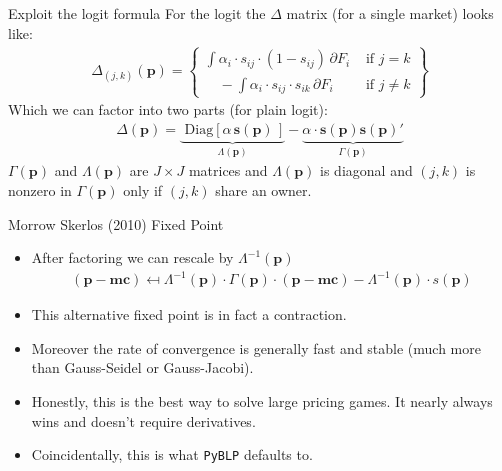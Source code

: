 \documentclass[aspectratio=169,10pt]{beamer}
\begin{document}
\begin{frame}{Exploit the logit formula}
For the logit the $\Delta$ matrix (for a single market) looks like:
\begin{align*}
\Delta_{(j,k)}(\symbf{p}) = \left\{\begin{array}{lr}
       \int \alpha_i \cdot s_{ij}\cdot (1-s_{ij}) \, \partial F_i& \text{ if } j=k \\
          \quad -\int \alpha_i \cdot s_{ij} \cdot s_{ik} \, \partial F_i &  \text{ if }  j\neq k 
        \end{array} \right\}
\end{align*}
Which we can factor into two parts (for plain logit):
\begin{align*}
\Delta(\symbf{p}) =  \underbrace{\text{ Diag}\left[ \alpha \, \symbf{s}(\symbf{p}) \, \right]}_{\Lambda(\symbf{p})} -  \underbrace{\alpha \cdot \symbf{s}(\symbf{p}) \symbf{s}(\symbf{p})'}_{\Gamma(\symbf{p})}
\end{align*}
$\Gamma(\symbf{p})$ and $\Lambda(\symbf{p})$ are $J \times J$ matrices and $\Lambda(\symbf{p})$ is diagonal and $(j,k)$ is nonzero in $\Gamma(\symbf{p})$ only if $(j,k)$ share an owner.
\end{frame}


\begin{frame}{Morrow Skerlos (2010) Fixed Point}
\begin{itemize}
\item After factoring we can rescale by $\Lambda^{-1} (\symbf{p})$
\begin{align*}
(\symbf{p}-\symbf{mc} ) \mapsfrom \Lambda^{-1}(\symbf{p}) \cdot \Gamma(\symbf{p})\cdot(\symbf{p}- \symbf{mc}) - \Lambda^{-1}(\symbf{p})\cdot s(\symbf{p})
\end{align*}
\item This alternative fixed point is in fact a contraction.
\item Moreover the rate of convergence is generally fast and stable (much more than Gauss-Seidel or Gauss-Jacobi).
\item Honestly, this is the best way to solve large pricing games. It nearly always wins and doesn't require derivatives.
\item Coincidentally, this is what \texttt{PyBLP} defaults to.
\end{itemize}
\end{frame}
\end{document}

